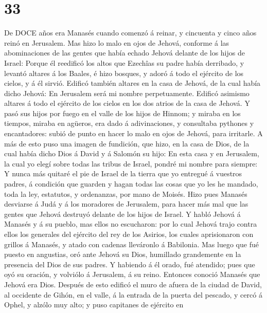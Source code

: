 \hypertarget{section-32}{%
\section{33}\label{section-32}}

 De DOCE años era Manasés cuando comenzó á reinar, y
cincuenta y cinco años reinó en Jerusalem.  Mas hizo lo malo
en ojos de Jehová, conforme á las abominaciones de las gentes que había
echado Jehová delante de los hijos de Israel:  Porque él
reedificó los altos que Ezechîas su padre había derribado, y levantó
altares á los Baales, é hizo bosques, y adoró á todo el ejército de los
cielos, y á él sirvió.  Edificó también altares en la casa
de Jehová, de la cual había dicho Jehová: En Jerusalem será mi nombre
perpetuamente.  Edificó asimismo altares á todo el ejército
de los cielos en los dos atrios de la casa de Jehová.  Y
pasó sus hijos por fuego en el valle de los hijos de Hinnom; y miraba en
los tiempos, miraba en agüeros, era dado á adivinaciones, y consultaba
pythones y encantadores: subió de punto en hacer lo malo en ojos de
Jehová, para irritarle.  A más de esto puso una imagen de
fundición, que hizo, en la casa de Dios, de la cual había dicho Dios á
David y á Salomón su hijo: En esta casa y en Jerusalem, la cual yo elegí
sobre todas las tribus de Israel, pondré mi nombre para siempre:
 Y nunca más quitaré el pie de Israel de la tierra que yo
entregué á vuestros padres, á condición que guarden y hagan todas las
cosas que yo les he mandado, toda la ley, estatutos, y ordenanzas, por
mano de Moisés.  Hizo pues Manasés desviarse á Judá y á los
moradores de Jerusalem, para hacer más mal que las gentes que Jehová
destruyó delante de los hijos de Israel.  Y habló Jehová á
Manasés y á su pueblo, mas ellos no escucharon: por lo cual Jehová trajo
contra ellos los generales del ejército del rey de los Asirios, los
cuales aprisionaron con grillos á Manasés, y atado con cadenas
lleváronlo á Babilonia.  Mas luego que fué puesto en
angustias, oró ante Jehová su Dios, humillado grandemente en la
presencia del Dios de sus padres.  Y habiendo á él orado,
fué atendido; pues que oyó su oración, y volviólo á Jerusalem, á su
reino. Entonces conoció Manasés que Jehová era Dios. 
Después de esto edificó el muro de afuera de la ciudad de David, al
occidente de Gihón, en el valle, á la entrada de la puerta del pescado,
y cercó á Ophel, y alzólo muy alto; y puso capitanes de ejército en
